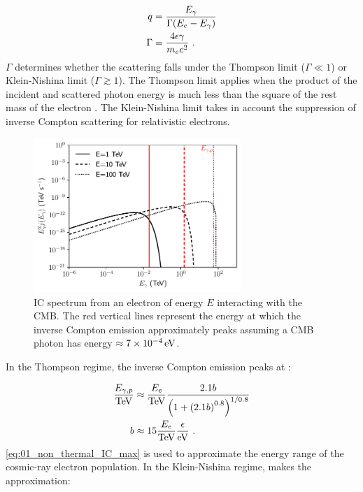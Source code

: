\begin{subequations}
    \begin{align}
        q&=\frac{E_\gamma}{\Gamma\qty(E_e-E_\gamma)} \\
        \Gamma&=\frac{4\epsilon\gamma}{m_ec^2}\text{ .}
    \end{align}
\end{subequations}
\noindent $\Gamma$ determines whether the scattering falls under the Thompson limit ($\Gamma \ll 1$) or Klein-Nishina limit ($\Gamma \gtrsim 1$). The Thompson limit applies when the product of the incident and scattered photon energy is much less than the square of the rest mass of the electron \citep{RevModPhys.42.237}. The Klein-Nishina limit  takes in account the suppression of inverse Compton scattering for relativistic electrons.
\begin{figure}
    \centering
    \includegraphics[width=0.7\textwidth]{04_Introduction/Images/non_thermal_emission/IC_spectrum.pdf}
    \caption{IC spectrum from an electron of energy $E$ interacting with the CMB.  The red vertical lines represent the energy at which the inverse Compton emission approximately peaks assuming a CMB photon has energy $\approx 7\times 10^{-4}\,\si{\electronvolt}$.}
    \label{fig:01_IC_flux}
\end{figure}
\newpar
In the Thompson regime, the inverse Compton emission peaks at \citep{2009ARA&A..47..523H}:

\begin{equation}
	\begin{split}
		\frac{E_{\gamma,p}}{\TeV}&\approx \frac{E_e}{\TeV}\frac{2.1b}{\qty(1+\qty(2.1b)^{0.8})^{1/0.8}} \\
		b&\approx 15\frac{E_e}{\TeV}\frac{\epsilon}{\eV}\text{ .}
	\end{split} \label{eq:01_non_thermal_IC_max}
\end{equation}
\noindent \autoref{eq:01_non_thermal_IC_max} is used to approximate the energy range of the cosmic-ray electron population. In the Klein-Nishina regime, \cite{doi:10.1126/science.abg5137} makes the approximation:

